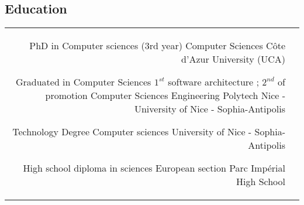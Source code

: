 \documentclass[10pt]{article} %
\begin{document}
\begin{paracol}{2}
\section{Education}





\begin{supertabular}{rl} %



		{PhD in Computer sciences (3rd year)} %
		{} %
		{Computer Sciences} %
		{Côte d'Azur University (UCA)} %


		{Graduated in Computer Sciences} %
		{$1^{st}$ software architecture ; $2^{nd}$ of promotion} %
		{Computer Sciences Engineering} %
		{Polytech Nice - University of Nice - Sophia-Antipolis} %


	{Technology Degree} %
	{} %
	{Computer sciences} %
	{University of Nice - Sophia-Antipolis} %


	{High school diploma in sciences} %
	{European section} %
	{} %
	{Parc Impérial High School} %


\end{supertabular}



\end{paracol}
\end{document}
